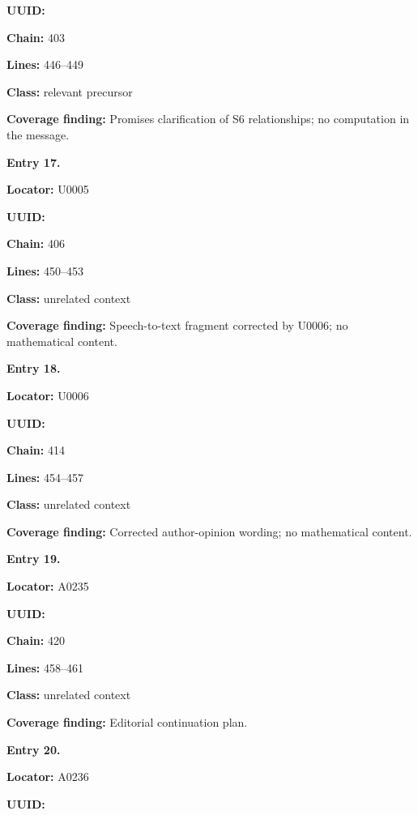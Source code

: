 \textbf{UUID:} \protect{}

\textbf{Chain:} 403

\textbf{Lines:} 446--449

\textbf{Class:} relevant precursor

\textbf{Coverage finding:} Promises clarification of S6 relationships;
no computation in the message.


\textbf{Entry 17.}

\textbf{Locator:} U0005

\textbf{UUID:} \protect{}

\textbf{Chain:} 406

\textbf{Lines:} 450--453

\textbf{Class:} unrelated context

\textbf{Coverage finding:} Speech-to-text fragment corrected by U0006;
no mathematical content.


\textbf{Entry 18.}

\textbf{Locator:} U0006

\textbf{UUID:} \protect{}

\textbf{Chain:} 414

\textbf{Lines:} 454--457

\textbf{Class:} unrelated context

\textbf{Coverage finding:} Corrected author-opinion wording; no
mathematical content.


\textbf{Entry 19.}

\textbf{Locator:} A0235

\textbf{UUID:} \protect{}

\textbf{Chain:} 420

\textbf{Lines:} 458--461

\textbf{Class:} unrelated context

\textbf{Coverage finding:} Editorial continuation plan.


\textbf{Entry 20.}

\textbf{Locator:} A0236

\textbf{UUID:} \protect{}

